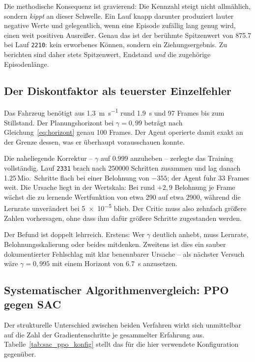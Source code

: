 Die methodische Konsequenz ist gravierend: Die Kennzahl steigt nicht allmählich, sondern \emph{kippt} an dieser Schwelle. Ein Lauf knapp darunter produziert lauter negative Werte und gelegentlich, wenn eine Episode zufällig lang genug wird, einen weit positiven Ausreißer. Genau das ist der berühmte Spitzenwert von \num{875.7} bei Lauf \texttt{2210}: kein erworbenes Können, sondern ein Ziehungsergebnis. Zu berichten sind daher stets Spitzenwert, Endstand \emph{und} die zugehörige Episodenlänge.

\subsection{Der Diskontfaktor als teuerster Einzelfehler}
\label{subsec:gamma}

Das Fahrzeug benötigt aus \SI{1.3}{\meter\per\second} rund \SI{1.9}{\second} und \num{97} Frames bis zum Stillstand. Der Planungshorizont bei $\gamma = 0{,}99$ beträgt nach Gleichung~\eqref{eq:horizont} genau \num{100} Frames. Der Agent operierte damit exakt an der Grenze dessen, was er überhaupt vorausschauen konnte.

Die naheliegende Korrektur -- $\gamma$ auf \num{0.999} anzuheben -- zerlegte das Training vollständig. Lauf \texttt{2331} brach nach \num{250000} Schritten zusammen und lag danach \num{1.25}\,Mio.\ Schritte flach bei einer Belohnung von $-355$; der Agent fuhr \num{33} Frames weit. Die Ursache liegt in der Wertskala: Bei rund $+2{,}9$ Belohnung je Frame wächst die zu lernende Wertfunktion von etwa \num{290} auf etwa \num{2900}, während die Lernrate unverändert bei \num{5e-5} blieb. Der Critic muss also zehnfach größere Zahlen vorhersagen, ohne dass ihm dafür größere Schritte zugestanden werden.

Der Befund ist doppelt lehrreich. Erstens: Wer $\gamma$ deutlich anhebt, muss Lernrate, Belohnungsskalierung oder beides mitdenken. Zweitens ist dies ein sauber dokumentierter Fehlschlag mit klar benennbarer Ursache -- als nächster Versuch wäre $\gamma = 0{,}995$ mit einem Horizont von \SI{6.7}{\second} anzusetzen.

\subsection{Systematischer Algorithmenvergleich: PPO gegen SAC}
\label{subsec:ppo_sac_vergleich}

Der strukturelle Unterschied zwischen beiden Verfahren wirkt sich unmittelbar auf die Zahl der Gradientenschritte je gesammelter Erfahrung aus. Tabelle~\ref{tab:sac_ppo_konfig} stellt das für die hier verwendete Konfiguration gegenüber.

